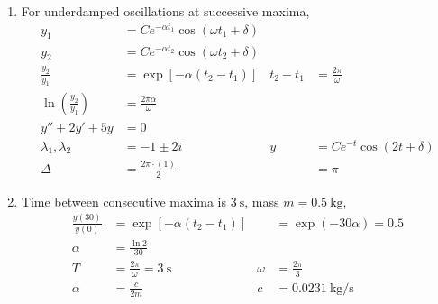 \begin{enumerate}
    \item For underdamped oscillations at successive maxima,
          \begin{align}
              y_{1}                                 & = Ce^{-\alpha t_{1}} \cos(\omega t_{1} + \delta)                                              \\
              y_{2}                                 & = Ce^{-\alpha t_{2}} \cos(\omega t_{2} + \delta)                                              \\
              \frac{y_{2}}{y_{1}}                   & = \exp[-\alpha(t_{2} - t_{1})]                   & t_{2} - t_{1} & = \frac{2\pi}{\omega}      \\
              \ln\left( \frac{y_{2}}{y_{1}} \right) & = \frac{2\pi \alpha}{\omega}                                                                  \\
              y'' + 2y' + 5y                        & = 0                                                                                           \\
              \lambda_{1}, \lambda_{2}              & = -1 \pm 2i                                      & y             & = Ce^{-t}\cos(2t + \delta) \\
              \Delta                                & = \frac{2\pi \cdot (1)}{2}                       &               & = \pi
          \end{align}

    \item Time between consecutive maxima is $ \SI{3}{\s} $, mass $ m = \SI{0.5}{\kg} $,
          \begin{align}
              \frac{y(30)}{y(0)} & = \exp\left[ -\alpha(t_{2} - t_{1}) \right] &        & = \exp(-30\alpha) = 0.5  \\
              \alpha             & = \frac{\ln 2}{30}                                                              \\
              T                  & = \frac{2\pi}{\omega} = \SI{3}{\s}          & \omega & = \frac{2\pi}{3}         \\
              \alpha             & = \frac{c}{2m}                              & c      & = \SI{0.0231}{\kg\per\s}
          \end{align}


\end{enumerate}
